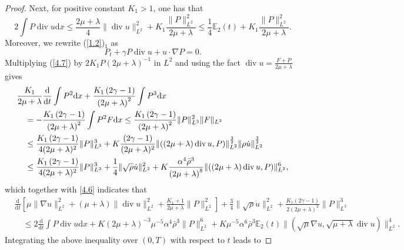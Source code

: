 \documentclass[11pt]{article}
\DeclareMathOperator{\divv}{div}
\begin{document}
\begin{proof}
Next, for positive constant $K_1 > 1 $, one has that
$$
2 \int P \divv u \mathrm{d} x
\leq \frac{2\mu + \lambda }{4} \|\divv u\|_{L^2}^2 + K_1 \frac{ \|P\|_{L^2}^2}{2 \mu + \lambda } \leq \frac{1}{4} \mathbb{E}_2 (t) + K_1 \frac{ \|P\|_{L^2}^2}{2 \mu + \lambda }.
$$
Moreover, we rewrite (\ref{1.2})$_1$ as
\begin{equation}\label{4.7}
P_t + \gamma P \divv u + u \cdot \nabla P = 0.
\end{equation}
Multiplying (\ref{4.7}) by $2 K_1 P \left(2 \mu + \lambda \right)^{-1}$ in $L^2$ and using the fact
$\divv u = \frac{F + P }{2 \mu + \lambda }$ gives
\begin{align*}
& \frac{K_1}{2 \mu + \lambda } \frac{\mathrm{d}}{\mathrm{d} t} \int P^2 \mathrm{d} x + \frac{K_1 \left( 2 \gamma - 1\right)}{\left(2 \mu + \lambda \right)^2} \int P^3 \mathrm{d} x\notag\\
& \quad = - \frac{ K_1 \left(2 \gamma - 1 \right)}{\left(2 \mu + \lambda \right)^2} \int P^2 F \mathrm{d} x \leq \frac{K_1 \left(2 \gamma - 1 \right)}{\left(2 \mu + \lambda \right)^2} \|P\|_{L^3}^2 \|F\|_{L^3}\notag\\
& \quad \leq \frac{K_1 \left(2 \gamma - 1 \right)}{4 (2 \mu + \lambda )^2} \|P\|_{L^3}^3 + K \frac{\left(2 \gamma - 1 \right)}{(2 \mu + \lambda )^2} \|((2 \mu + \lambda )\divv u, P)\|_{L^2}^{\frac{3}{2}} \|\rho \dot u\|_{L^2}^{\frac{3}{2}}\notag\\
& \quad \leq \frac{K_1 \left(2 \gamma - 1 \right)}{4 (2 \mu + \lambda )^2} \|P\|_{L^3}^3 + \frac{1}{4} \|\sqrt{\rho} \dot{u}\|_{L^2}^2 + K \frac{\alpha^{4} \bar{\rho}^3}{\left( 2 \mu + \lambda \right)^8} \|((2 \mu + \lambda )\divv u, P)\|_{L^2}^6,
\end{align*}
which together with \eqref{4.6} indicates that
\begin{align*}
& \frac{\mathrm{d}}{\mathrm{d} t} \left[\mu \|\nabla u\|_{L^2}^2 + \left(\mu + \lambda \right)\|\divv u\|_{L^2}^2 + \frac{K_1 + 1}{2 \mu + \lambda } \|P\|_{L^2}^2 \right] + \frac{3}{4} \|\sqrt{\rho} \dot{u}\|_{L^2}^2 + \frac{K_1 \left( 2 \gamma - 1\right)}{2 \left(2 \mu + \lambda \right)^2} \|P\|_{L^3}^3\\
& \quad \leq 2 \frac{\mathrm{d}}{\mathrm{d} t} \int P \divv u \mathrm{d} x + K \left( 2 \mu + \lambda \right)^{-3} \mu^{-5} \alpha^4 \bar{\rho}^3 \|P\|_{L^2}^6 + K \mu^{-5} \alpha^6 \bar{\rho}^3 \mathbb{E}_2 (t) \|(\sqrt{\mu}\nabla u, \sqrt{\mu + \lambda} \divv u)\|_{L^2}^4.
\end{align*}
Integrating the above inequality over $(0,T)$ with respect to $t$ leads to

\end{proof}
\end{document}
